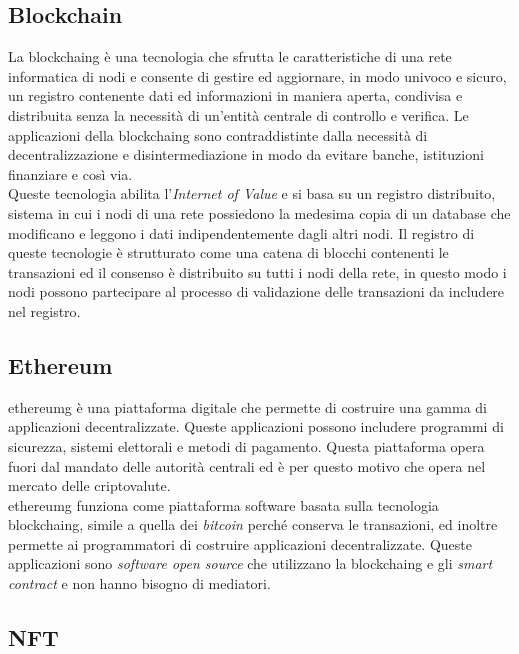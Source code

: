 \subsection{Blockchain}
\label{subsec:blockchain}

La \gls{blockchaing} è una tecnologia che sfrutta le caratteristiche di una rete informatica di nodi e consente di gestire ed aggiornare, in modo univoco e sicuro, un registro contenente dati ed informazioni in maniera aperta, condivisa e distribuita senza la necessità di un'entità centrale di controllo e verifica. Le applicazioni della \gls{blockchaing} sono contraddistinte dalla necessità di decentralizzazione e disintermediazione in modo da evitare banche, istituzioni finanziare e così via.\\
Queste tecnologia abilita l'\textit{Internet of Value} e si basa su un registro distribuito, sistema in cui i nodi di una rete possiedono la medesima copia di un database che modificano e leggono i dati indipendentemente dagli altri nodi. Il registro di queste tecnologie è strutturato come una catena di blocchi contenenti le transazioni ed il consenso è distribuito su tutti i nodi della rete, in questo modo i nodi possono partecipare al processo di validazione delle transazioni da includere nel registro.

\subsection{Ethereum}
\label{subsec:ethereum}

\gls{ethereumg} è una piattaforma digitale che permette di costruire una gamma di applicazioni decentralizzate. Queste applicazioni possono includere programmi di sicurezza, sistemi elettorali e metodi di pagamento. Questa piattaforma opera fuori dal mandato delle autorità centrali ed è per questo motivo che opera nel mercato delle criptovalute.\\
\gls{ethereumg} funziona come piattaforma software basata sulla tecnologia \gls{blockchaing}, simile a quella dei \textit{bitcoin} perché conserva le transazioni, ed inoltre permette ai programmatori di costruire applicazioni decentralizzate. Queste applicazioni sono \textit{software open source} che utilizzano la \gls{blockchaing} e gli \textit{smart contract} e non hanno bisogno di mediatori. 

\subsection{NFT}
\label{subsec:nft}

